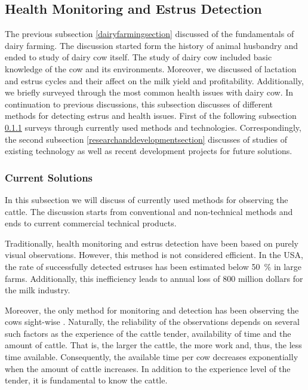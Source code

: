 \documentclass[english,12pt,a4paper,pdftex,elec,utf8]{aaltothesis}
\begin{document}
\subsection{Health Monitoring and Estrus Detection} \label{healthmonitoringandestrusdetectionsection}

The previous subsection \ref{dairyfarmingsection} discussed of the fundamentals of dairy farming. The discussion started form the history of animal husbandry and ended to study of dairy cow itself. The study of dairy cow included basic knowledge of the cow and its environments. Moreover, we discussed of lactation and estrus cycles and their affect on the milk yield and profitability. Additionally, we briefly surveyed through the most common health issues with dairy cow. In continuation to previous discussions, this subsection discusses of different methods for detecting estrus and health issues. First of the following subsection \ref{currentsolutionssection} surveys through currently used methods and technologies. Correspondingly, the second subsection \ref{researchanddevelopmentsection} discusses of studies of existing technology as well as recent development projects for future solutions.   \\


\subsubsection{Current Solutions} \label{currentsolutionssection}

In this subsection we will discuss of currently used methods for observing the cattle. The discussion starts from conventional and non-technical methods and ends to current commercial technical products.

Traditionally, health monitoring and estrus detection have been based on purely visual observations. However, this method is not considered efficient. In the USA, the rate of successfully detected estruses has been estimated below \SI{50}{\percent} in large farms. Additionally, this inefficiency leads to annual loss of 800 million dollars for the milk industry. \cite{BRUNASSI2010}


Moreover, the only method for monitoring and detection has been observing the cows sight-wise \cite{lehmahavaintoja}. Naturally, the reliability of the observations depends on several such factors as the experience of the cattle tender, availability of time and the amount of cattle. That is, the larger the cattle, the more work and, thus, the less time available. Consequently, the available time per cow decreases exponentially when the amount of cattle increases. In addition to the experience level of the tender, it is fundamental to know the cattle. \\
\end{document}
